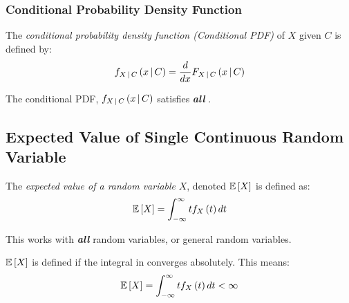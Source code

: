 		\subsubsection{Conditional Probability Density Function} \label{subsubsec:Conditional Probability Density Function}
			\begin{definition} \label{def:Conditional Probability Density Function}
				The \emph{conditional probability density function (Conditional PDF)} of $X$ given $C$ is defined by:
				\begin{equation} \label{eq:Conditional Probability Density Function}
					f_{X \operatorname{\vert} C} \left( x \operatorname{\vert} C \right) = \frac{d}{dx} F_{X \operatorname{\vert} C} \left( x \operatorname{\vert} C \right)
				\end{equation}
				\begin{remark}
					The conditional PDF, $f_{X \operatorname{\vert} C} \left( x \operatorname{\vert} C \right)$ satisfies \emph{\textbf{all}} .
				\end{remark}
			\end{definition}
	
	\subsection{Expected Value of Single Continuous Random Variable} \label{subsec:Expected Value of Single Continuous}
		\begin{definition} \label{def:Expected Value of Single Continuous}
			The \emph{expected value of a random variable} $X$, denoted $\operatorname{\operatorname{\mathbb{E}}} \left[ X \right]$ is defined as:
			\begin{equation} \label{eq:Expected Value of Single Continuous}
				\operatorname{\operatorname{\mathbb{E}}} \left[ X \right] = \int_{-\infty}^{\infty} t f_{X} \left( t \right) dt
			\end{equation}
			\begin{remark}
				This works with \emph{\textbf{all}} random variables, or general random variables.
			\end{remark}
			\begin{remark}
				$\operatorname{\operatorname{\mathbb{E}}} \left[ X \right]$ is defined if the integral in  converges absolutely.
				This means:
				\begin{equation*}
					\operatorname{\operatorname{\mathbb{E}}} \left[ X \right] = \int_{-\infty}^{\infty} t f_{X} \left( t \right) dt < \infty
				\end{equation*}
			\end{remark}
		\end{definition}
	
